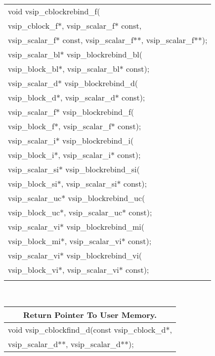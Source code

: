 {\begin{tabular}[H]{l}
void vsip\_cblockrebind\_f(\\*\hspace{.7cm}vsip\_cblock\_f*, vsip\_scalar\_f* const,\\*\hspace{.7cm}vsip\_scalar\_f* const, vsip\_scalar\_f**, vsip\_scalar\_f**);\\
vsip\_scalar\_bl* vsip\_blockrebind\_bl(\\*\hspace{.7cm}vsip\_block\_bl*, vsip\_scalar\_bl* const);\\
vsip\_scalar\_d* vsip\_blockrebind\_d(\\*\hspace{.7cm}vsip\_block\_d*, vsip\_scalar\_d* const);\\
vsip\_scalar\_f* vsip\_blockrebind\_f(\\*\hspace{.7cm}vsip\_block\_f*, vsip\_scalar\_f* const);\\
vsip\_scalar\_i* vsip\_blockrebind\_i(\\*\hspace{.7cm}vsip\_block\_i*, vsip\_scalar\_i* const);\\
vsip\_scalar\_si* vsip\_blockrebind\_si(\\*\hspace{.7cm}vsip\_block\_si*, vsip\_scalar\_si* const);\\
vsip\_scalar\_uc* vsip\_blockrebind\_uc(\\*\hspace{.7cm}vsip\_block\_uc*, vsip\_scalar\_uc* const);\\
vsip\_scalar\_vi* vsip\_blockrebind\_mi(\\*\hspace{.7cm}vsip\_block\_mi*, vsip\_scalar\_vi* const);\\
vsip\_scalar\_vi* vsip\_blockrebind\_vi(\\*\hspace{.7cm}vsip\_block\_vi*, vsip\_scalar\_vi* const);\\\\
\end{tabular}\\
\begin{tabular}[H]{l}
\multicolumn{1}{c}{\rmfamily \bfseries Return Pointer To User Memory.\vspace{.1cm}}\\ \hline
void vsip\_cblockfind\_d(const vsip\_cblock\_d*,\\*\hspace{.7cm}vsip\_scalar\_d**, vsip\_scalar\_d**);\\

\end{tabular}}
